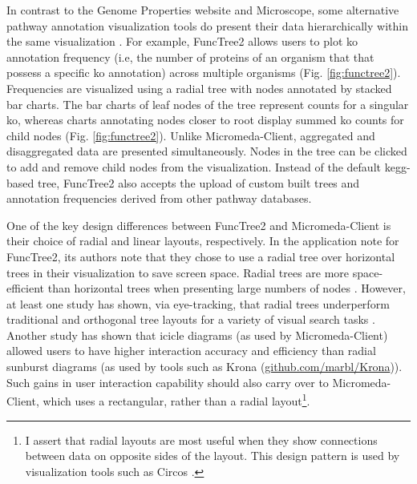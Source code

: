 In contrast to the Genome Properties website and Microscope, some alternative 
pathway annotation visualization tools do present their data hierarchically 
within the same visualization \cite{darzi2019functree2}. For example, FuncTree2
\cite{darzi2019functree2} allows users to plot \gls{ko} annotation 
\cite{mao2005automated,kanehisa2011kegg} frequency (i.e, the number of proteins 
of an organism that that possess a specific \gls{ko} annotation) across 
multiple organisms (Fig. \ref{fig:functree2}). Frequencies are visualized using 
a radial tree with nodes annotated by stacked bar charts. The bar charts of leaf 
nodes of the tree represent counts for a singular \gls{ko}, whereas charts 
annotating nodes closer to root display summed \gls{ko} counts for child nodes 
(Fig. \ref{fig:functree2}). Unlike Micromeda-Client, aggregated and 
disaggregated data are presented simultaneously. Nodes in the tree can be 
clicked to add and remove child nodes from the visualization. Instead of the 
default \gls{kegg}-based tree, FuncTree2 also accepts the upload of custom 
built trees and annotation frequencies derived from other pathway databases.

One of the key design differences between FuncTree2 and Micromeda-Client is 
their choice of radial and linear layouts, respectively. In the application note 
for FuncTree2, its authors note that they chose to use a radial tree over 
horizontal trees in their visualization to save screen space. Radial trees are 
more space-efficient than horizontal trees when presenting large numbers of 
nodes \cite{burch2011evaluation}. However, at least one study has shown, via 
eye-tracking, that radial trees underperform traditional and orthogonal tree 
layouts for a variety of visual search tasks \cite{burch2011evaluation}. Another 
study has shown that icicle diagrams (as used by Micromeda-Client) allowed users 
to have higher interaction accuracy and efficiency \cite{muramalla2017radial} 
than radial sunburst diagrams (as used by tools such as Krona 
\cite{ondov2011interactive} 
(\href{http://github.com/marbl/Krona}{github.com/marbl/Krona})).
Such gains in user interaction capability should also carry over to 
Micromeda-Client, which uses a rectangular, rather than a radial 
layout\footnote{I assert that radial layouts are most useful when they show 
connections between data on opposite sides of the layout. This design 
pattern is used by visualization tools such as Circos 
\cite{krzywinski2009circos}.}.

